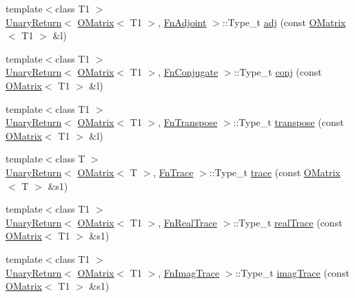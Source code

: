 \begin{DoxyCompactItemize}
{\footnotesize template$<$class T1 $>$ }\\\mbox{\hyperlink{structENSEM_1_1UnaryReturn}{Unary\+Return}}$<$ \mbox{\hyperlink{classENSEM_1_1OMatrix}{O\+Matrix}}$<$ T1 $>$, \mbox{\hyperlink{structENSEM_1_1FnAdjoint}{Fn\+Adjoint}} $>$\+::Type\+\_\+t \mbox{\hyperlink{group__obsmatrix_gab99c32b7f3eabbe8b6a6ec2834914c88}{adj}} (const \mbox{\hyperlink{classENSEM_1_1OMatrix}{O\+Matrix}}$<$ T1 $>$ \&l)
\item 
{\footnotesize template$<$class T1 $>$ }\\\mbox{\hyperlink{structENSEM_1_1UnaryReturn}{Unary\+Return}}$<$ \mbox{\hyperlink{classENSEM_1_1OMatrix}{O\+Matrix}}$<$ T1 $>$, \mbox{\hyperlink{structENSEM_1_1FnConjugate}{Fn\+Conjugate}} $>$\+::Type\+\_\+t \mbox{\hyperlink{group__obsmatrix_gaa0e14166cccccfb643584dfa83138cb2}{conj}} (const \mbox{\hyperlink{classENSEM_1_1OMatrix}{O\+Matrix}}$<$ T1 $>$ \&l)
\item 
{\footnotesize template$<$class T1 $>$ }\\\mbox{\hyperlink{structENSEM_1_1UnaryReturn}{Unary\+Return}}$<$ \mbox{\hyperlink{classENSEM_1_1OMatrix}{O\+Matrix}}$<$ T1 $>$, \mbox{\hyperlink{structENSEM_1_1FnTranspose}{Fn\+Transpose}} $>$\+::Type\+\_\+t \mbox{\hyperlink{group__obsmatrix_gae3097e7f8ff8914a37a874367aed476b}{transpose}} (const \mbox{\hyperlink{classENSEM_1_1OMatrix}{O\+Matrix}}$<$ T1 $>$ \&l)
\item 
{\footnotesize template$<$class T $>$ }\\\mbox{\hyperlink{structENSEM_1_1UnaryReturn}{Unary\+Return}}$<$ \mbox{\hyperlink{classENSEM_1_1OMatrix}{O\+Matrix}}$<$ T $>$, \mbox{\hyperlink{structENSEM_1_1FnTrace}{Fn\+Trace}} $>$\+::Type\+\_\+t \mbox{\hyperlink{group__obsmatrix_gaff7b73c5978746f6706e0cd02f55cc40}{trace}} (const \mbox{\hyperlink{classENSEM_1_1OMatrix}{O\+Matrix}}$<$ T $>$ \&s1)
\item 
{\footnotesize template$<$class T1 $>$ }\\\mbox{\hyperlink{structENSEM_1_1UnaryReturn}{Unary\+Return}}$<$ \mbox{\hyperlink{classENSEM_1_1OMatrix}{O\+Matrix}}$<$ T1 $>$, \mbox{\hyperlink{structENSEM_1_1FnRealTrace}{Fn\+Real\+Trace}} $>$\+::Type\+\_\+t \mbox{\hyperlink{group__obsmatrix_gab3988428b88d3b56d2f959c536ec7d2a}{real\+Trace}} (const \mbox{\hyperlink{classENSEM_1_1OMatrix}{O\+Matrix}}$<$ T1 $>$ \&s1)
\item 
{\footnotesize template$<$class T1 $>$ }\\\mbox{\hyperlink{structENSEM_1_1UnaryReturn}{Unary\+Return}}$<$ \mbox{\hyperlink{classENSEM_1_1OMatrix}{O\+Matrix}}$<$ T1 $>$, \mbox{\hyperlink{structENSEM_1_1FnImagTrace}{Fn\+Imag\+Trace}} $>$\+::Type\+\_\+t \mbox{\hyperlink{group__obsmatrix_ga3c2758e95f41075ca3a027c6651a66aa}{imag\+Trace}} (const \mbox{\hyperlink{classENSEM_1_1OMatrix}{O\+Matrix}}$<$ T1 $>$ \&s1)

\end{DoxyCompactItemize}
